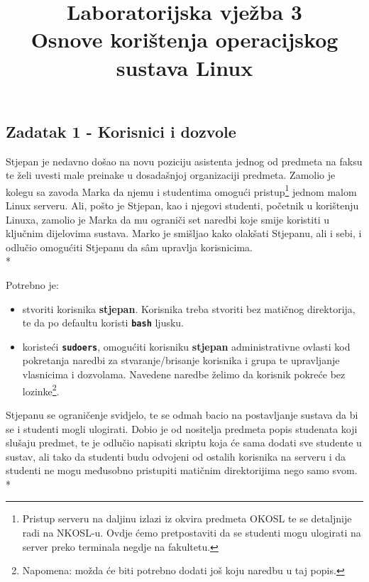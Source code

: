 \documentclass[12pt,a4paper]{article}
\newcommand{\shell}[1]{\texttt{\textbf{#1}}}
\begin{document}
	\title{Laboratorijska vježba 3\\{\small Osnove korištenja operacijskog sustava Linux}\vspace{-2em}}
	\maketitle
	
  \subsection*{Zadatak 1 - Korisnici i dozvole}
  Stjepan je nedavno došao na novu poziciju asistenta jednog od predmeta na faksu te želi uvesti male preinake u dosadašnjoj organizaciji predmeta. Zamolio je kolegu sa zavoda Marka da njemu i studentima omogući pristup\footnote{Pristup serveru na daljinu izlazi iz okvira predmeta OKOSL te se detaljnije radi na NKOSL-u. Ovdje ćemo pretpostaviti da se studenti mogu ulogirati na server preko terminala negdje na fakultetu.} jednom malom Linux serveru. Ali, pošto je Stjepan, kao i njegovi studenti, početnik u korištenju Linuxa, zamolio je Marka da mu ograniči set naredbi koje smije koristiti u ključnim dijelovima sustava. Marko je smišljao kako olakšati Stjepanu, ali i sebi, i odlučio omogućiti Stjepanu da sâm upravlja korisnicima.\\*

\noindent Potrebno je:
\begin{itemize}
\item stvoriti korisnika \textbf{stjepan}. Korisnika treba stvoriti bez matičnog direktorija, te da po defaultu koristi \shell{bash} ljusku.
\item koristeći \shell{sudoers}, omogućiti korisniku \textbf{stjepan} administrativne ovlasti kod pokretanja naredbi za stvaranje/brisanje korisnika i grupa te upravljanje vlasnicima i dozvolama. Navedene naredbe želimo da korisnik pokreće bez lozinke\footnote{Napomena: možda će biti potrebno dodati još koju naredbu u taj popis.}.
\end{itemize}

\noindent Stjepanu se ograničenje svidjelo, te se odmah bacio na postavljanje sustava da bi se i studenti mogli ulogirati. Dobio je od nositelja predmeta popis studenata koji slušaju predmet, te je odlučio napisati skriptu koja će sama dodati sve studente u sustav, ali tako da studenti budu odvojeni od ostalih korisnika na serveru i da studenti ne mogu međusobno pristupiti matičnim direktorijima nego samo svom.\\*
\end{document}
